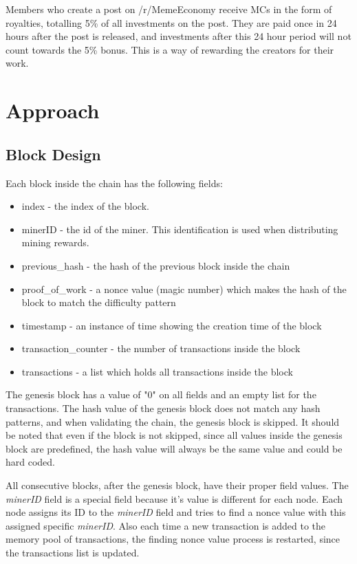 \documentclass[12pt]{article}
\begin{document}
Members who create a post on /r/MemeEconomy receive \acp{MC} in the form of royalties, totalling 5\% of all investments on the post. They are paid once in 24 hours after the post is released, and investments after this 24 hour period will not count towards the 5\% bonus. This is a way of rewarding the creators for their work.


\section{Approach} \label{sec:Approach}

\subsection{Block Design} \label{sec:BlockDesign} %

Each block inside the chain has the following fields:

\begin{itemize}
  \item index - the index of the block.
  \item minerID - the id of the miner. This identification is used when distributing mining rewards.
  \item previous\_hash - the hash of the previous block inside the chain
  \item proof\_of\_work - a nonce value (magic number) which makes the hash of the block to match the difficulty pattern
  \item timestamp - an instance of time showing the creation time of the block
  \item transaction\_counter - the number of transactions inside the block
  \item transactions - a list which holds all transactions inside the block
\end{itemize}

The genesis block has a value of "0" on all fields and an empty list for the transactions. The hash value of the genesis block does not match any hash patterns, and when validating the chain, the genesis block is skipped. It should be noted that even if the block is not skipped, since all values inside the genesis block are predefined, the hash value will always be the same value and could be hard coded.

All consecutive blocks, after the genesis block, have their proper field values. The \textit{minerID} field is a special field because it's value is different for each node. Each node assigns its ID to the \textit{minerID} field and tries to find a nonce value with this assigned specific \textit{minerID}. Also each time a new transaction is added to the memory pool of transactions, the finding nonce value process is restarted, since the transactions list is updated.
\end{document}
